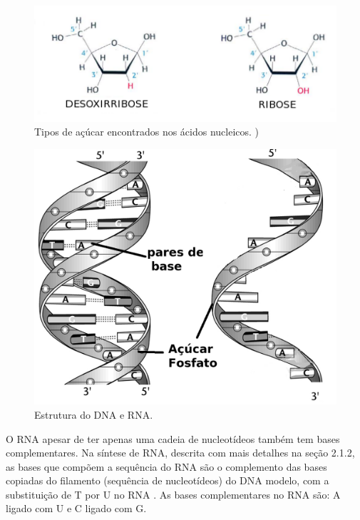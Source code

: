 \begin{figure}[htb!]
    \centering
    \includegraphics[scale=0.7]{./imagens/tipos_acucar.png}
    \caption{Tipos de açúcar encontrados nos ácidos nucleicos. \cite[Adaptada]{Berg2007})}
    \label{fig:tipos_acucar}
\end{figure}


\begin{figure}[htb!]
    \centering
    \includegraphics[scale=0.7]{./imagens/estrutura_DNA_RNA.jpg}
    \caption{Estrutura do DNA e RNA. \cite[Adaptada]{Higgs2005}}
    \label{fig:estrutura_DNA_RNA}
\end{figure}



O RNA apesar de ter apenas uma cadeia de nucleotídeos também tem bases complementares. Na síntese de RNA, descrita com mais detalhes na seção 2.1.2, as bases que compõem a sequência do RNA são o complemento das bases copiadas do filamento (sequência de nucleotídeos) do DNA modelo, com a substituição de T por U no RNA . As bases complementares no RNA são: A ligado com U e C ligado com G.



